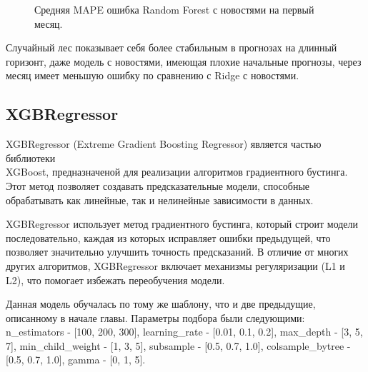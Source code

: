 \documentclass[12pt, a4paper]{article}
\begin{document}
\begin{figure}[!h]
\caption{Средняя MAPE ошибка Random Forest с новостями на первый месяц.}
\label{fig:random_forest_with_news}
\end{figure}

Случайный лес показывает себя более стабильным в прогнозах на длинный горизонт, даже модель с новостями, имеющая плохие начальные прогнозы, через месяц имеет меньшую ошибку по сравнению с Ridge с новостями.

\subsection{XGBRegressor}

XGBRegressor (Extreme Gradient Boosting Regressor) является частью библиотеки\\XGBoost, предназначеной для реализации алгоритмов градиентного бустинга. Этот метод позволяет создавать предсказательные модели, способные обрабатывать как линейные, так и нелинейные зависимости в данных.

XGBRegressor использует метод градиентного бустинга, который строит модели последовательно, каждая из которых исправляет ошибки предыдущей, что позволяет значительно улучшить точность предсказаний. В отличие от многих других алгоритмов, XGBRegressor включает механизмы регуляризации (L1 и L2), что помогает избежать переобучения модели.

Данная модель обучалась по тому же шаблону, что и две предыдущие, описанному в начале главы. Параметры подбора были следующими: n\_estimators - [100, 200, 300], learning\_rate - [0.01, 0.1, 0.2], max\_depth - [3, 5, 7], min\_child\_weight - [1, 3, 5], subsample - [0.5, 0.7, 1.0], colsample\_bytree - [0.5, 0.7, 1.0], gamma - [0, 1, 5].
\end{document}
